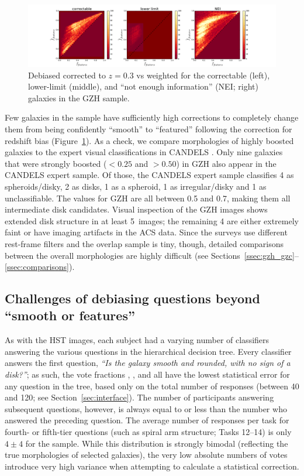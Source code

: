 \documentclass[a4paper,fleqn,usenatbib]{mnras}
\begin{document}
\begin{figure}
\center
\includegraphics[width=\textwidth]{figures/debiased_corrections.pdf}
\caption{Debiased \ffeatures{} corrected to $z=0.3$ vs weighted \ffeatures{}
for the correctable (left), lower-limit (middle), and ``not enough
information'' (NEI; right) galaxies in the GZH sample.}
\label{fig:debiased_corrections}
\end{figure}


Few galaxies in the sample have sufficiently high corrections to completely
change them from being confidently ``smooth'' to ``featured'' following the
correction for redshift bias (Figure~\ref{fig:debiased_corrections}). As a
check, we compare morphologies of highly boosted galaxies to the expert visual
classifications in CANDELS \citep{kar15}.  Only nine galaxies that
were strongly boosted (\ffeatures$<0.25$ and \ffeaturesdebiased$>0.50$) in GZH also
appear in the CANDELS expert sample. Of those, the CANDELS expert sample
classifies 4 as spheroids/disky, 2 as disks, 1 as a spheroid, 1 as
irregular/disky and 1 as unclassifiable. The \fbest{} values for GZH are all
between 0.5 and 0.7, making them all intermediate disk candidates. Visual
inspection of the GZH images shows extended disk structure in at least
5~images; the remaining 4 are either extremely faint or have imaging artifacts
in the ACS data.  Since the surveys use different rest-frame filters and the
overlap sample is tiny, though, detailed comparisons between the overall
morphologies are highly difficult (see
Sections~\ref{ssec:gzh_gzc}--\ref{ssec:comparisons}).

\subsection{Challenges of debiasing questions beyond ``smooth or features''}\label{ssec:higher_order_tasks}

As with the HST images, each \ferengi{} subject had a varying number of
classifiers answering the various questions in the hierarchical decision tree.
Every classifier answers the first question, {\it ``Is the galaxy smooth and
rounded, with no sign of a disk?''}; as such, the vote fractions \fsmooth,
\ffeatures, and \fartifact{} all have the lowest statistical error for any
question in the tree, based only on the total number of responses (between
40 and 120; see Section~\ref{sec:interface}).  The number of participants
answering subsequent questions, however, is always equal to or less than the
number who answered the preceding question. The average number of responses per
task for fourth- or fifth-tier questions (such as spiral arm structure; Tasks
12--14) is only $4\pm4$ for the \ferengi{} sample. While this distribution is
strongly bimodal (reflecting the true morphologies of selected galaxies), the
very low absolute numbers of votes introduce very high variance when attempting
to calculate a statistical correction.
\end{document}
